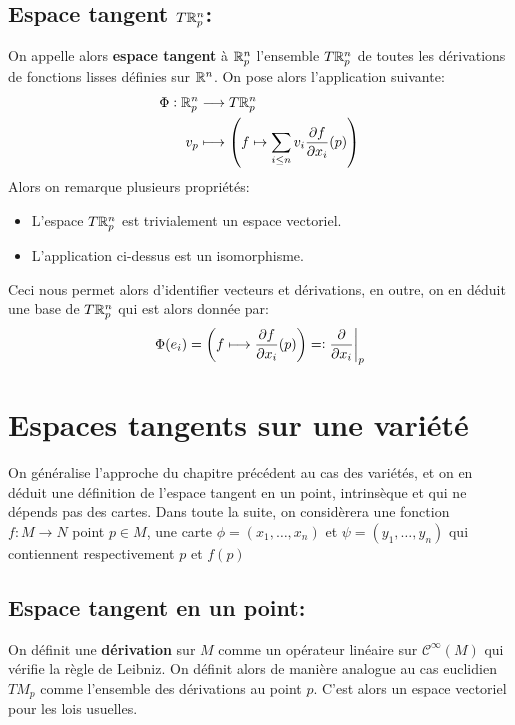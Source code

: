 \section{Espace tangent \( T\mathbb{R}^n_p \):}
On appelle alors \textbf{espace tangent} à \( \mathbb{R}^n_p \) l'ensemble \( T\mathbb{R}^n_p \) de toutes les dérivations de fonctions lisses définies sur \( \mathbb{R}^n \). On pose alors l'application suivante:
\[ 
   \begin{aligned}
      \Phi : \mathbb{R}^n_p &\longrightarrow T\mathbb{R}^n_p \\
      v_p &\longmapsto \left( f \mapsto \sum_{i \leq n} v_i \frac{\partial f}{\partial x_i}(p) \right)
   \end{aligned} 
\]
Alors on remarque plusieurs propriétés:
\begin{itemize}
   \item L'espace \( T\mathbb{R}^n_p \) est trivialement un espace vectoriel.
   \item L'application ci-dessus est un isomorphisme.
\end{itemize}
Ceci nous permet alors d'identifier vecteurs et dérivations, en outre, on en déduit une base de \( T\mathbb{R}^n_p \) qui est alors donnée par:
\[ 
   \Phi(e_i) = \left(f \longmapsto \frac{\partial f}{\partial x_i}(p)\right) =: \frac{\partial }{\partial x_i}\biggr|_p
\] 
\chapter{Espaces tangents sur une variété}
On généralise l'approche du chapitre précédent au cas des variétés, et on en déduit une définition de l'espace tangent en un point, intrinsèque et qui ne dépends pas des cartes. Dans toute la suite, on considèrera une fonction \( f : M \longrightarrow N \) point \( p \in M \), une carte \( \phi = (x_1, \ldots, x_n) \) et \( \psi = (y_1, \ldots, y_n) \) qui contiennent respectivement \( p \) et \( f(p) \)
\section{Espace tangent en un point:}
On définit une \textbf{dérivation} sur \( M \) comme un opérateur linéaire sur \( \mathcal{C}^\infty(M) \) qui vérifie la règle de Leibniz. On définit alors de manière analogue au cas euclidien \( TM_p \) comme l'ensemble des dérivations au point \( p \). C'est alors un espace vectoriel pour les lois usuelles.

